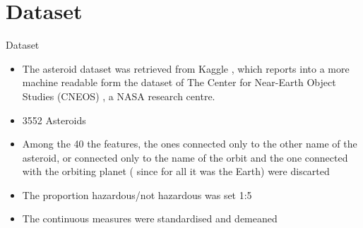 \documentclass{beamer}
\begin{document}
\section{Dataset}

\begin{frame}{Dataset}
\begin{itemize}


\item The asteroid dataset was retrieved from Kaggle \cite{kaggle_dataset}, which reports into a more machine readable form the dataset of The Center for Near-Earth Object Studies (CNEOS) \cite{cneos+nasa}, a NASA research centre.

\item 3552 Asteroids

\item Among the 40 the features, the ones connected only to the other name of
the asteroid, or connected only to the name of the orbit and
the one connected with the orbiting planet ( since for all it was
the Earth) were discarted

\item The proportion hazardous/not hazardous was set 1:5  

\item The continuous measures were standardised and demeaned

\end{itemize}
\end{frame}
\end{document}
